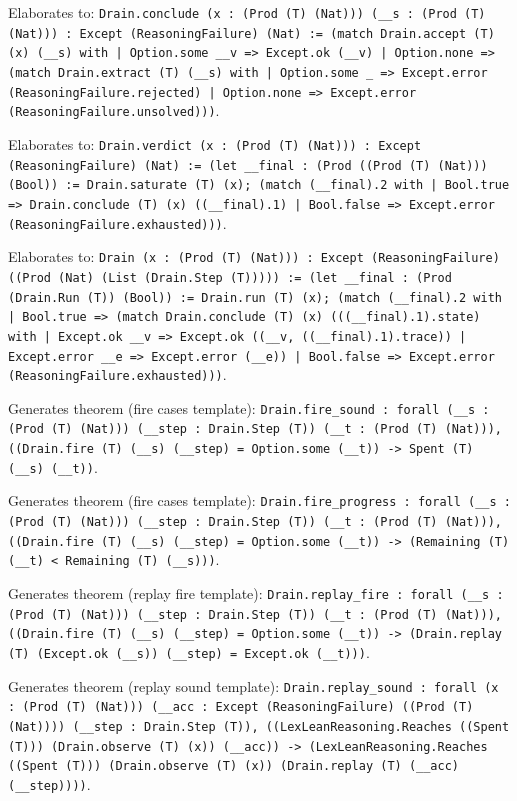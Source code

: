 \documentclass[11pt]{article}
\begin{document}
\noindent Elaborates to: \texttt{Drain.conclude (x : (Prod (T) (Nat))) (\_\_s : (Prod (T) (Nat))) : Except (ReasoningFailure) (Nat) := (match Drain.accept (T) (x) (\_\_s) with | Option.some \_\_v => Except.ok (\_\_v) | Option.none => (match Drain.extract (T) (\_\_s) with | Option.some \_ => Except.error (ReasoningFailure.rejected) | Option.none => Except.error (ReasoningFailure.unsolved)))}.\par
\noindent Elaborates to: \texttt{Drain.verdict (x : (Prod (T) (Nat))) : Except (ReasoningFailure) (Nat) := (let \_\_final : (Prod ((Prod (T) (Nat))) (Bool)) := Drain.saturate (T) (x); (match (\_\_final).2 with | Bool.true => Drain.conclude (T) (x) ((\_\_final).1) | Bool.false => Except.error (ReasoningFailure.exhausted)))}.\par
\noindent Elaborates to: \texttt{Drain (x : (Prod (T) (Nat))) : Except (ReasoningFailure) ((Prod (Nat) (List (Drain.Step (T))))) := (let \_\_final : (Prod (Drain.Run (T)) (Bool)) := Drain.run (T) (x); (match (\_\_final).2 with | Bool.true => (match Drain.conclude (T) (x) (((\_\_final).1).state) with | Except.ok \_\_v => Except.ok ((\_\_v, ((\_\_final).1).trace)) | Except.error \_\_e => Except.error (\_\_e)) | Bool.false => Except.error (ReasoningFailure.exhausted)))}.\par
\noindent Generates theorem (fire cases template): \texttt{Drain.fire\_sound : forall (\_\_s : (Prod (T) (Nat))) (\_\_step : Drain.Step (T)) (\_\_t : (Prod (T) (Nat))), ((Drain.fire (T) (\_\_s) (\_\_step) = Option.some (\_\_t)) -> Spent (T) (\_\_s) (\_\_t))}.\par
\noindent Generates theorem (fire cases template): \texttt{Drain.fire\_progress : forall (\_\_s : (Prod (T) (Nat))) (\_\_step : Drain.Step (T)) (\_\_t : (Prod (T) (Nat))), ((Drain.fire (T) (\_\_s) (\_\_step) = Option.some (\_\_t)) -> (Remaining (T) (\_\_t) < Remaining (T) (\_\_s)))}.\par
\noindent Generates theorem (replay fire template): \texttt{Drain.replay\_fire : forall (\_\_s : (Prod (T) (Nat))) (\_\_step : Drain.Step (T)) (\_\_t : (Prod (T) (Nat))), ((Drain.fire (T) (\_\_s) (\_\_step) = Option.some (\_\_t)) -> (Drain.replay (T) (Except.ok (\_\_s)) (\_\_step) = Except.ok (\_\_t)))}.\par
\noindent Generates theorem (replay sound template): \texttt{Drain.replay\_sound : forall (x : (Prod (T) (Nat))) (\_\_acc : Except (ReasoningFailure) ((Prod (T) (Nat)))) (\_\_step : Drain.Step (T)), ((LexLeanReasoning.Reaches ((Spent (T))) (Drain.observe (T) (x)) (\_\_acc)) -> (LexLeanReasoning.Reaches ((Spent (T))) (Drain.observe (T) (x)) (Drain.replay (T) (\_\_acc) (\_\_step))))}.\par
\end{document}
